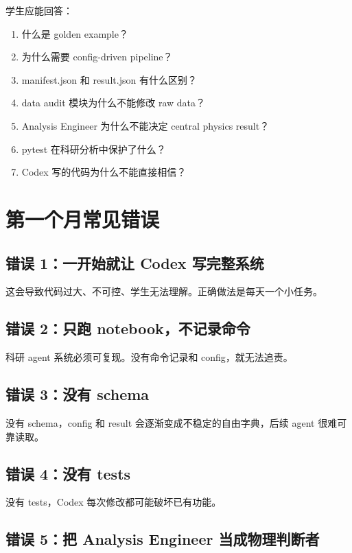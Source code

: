 \documentclass[11pt,a4paper,fontset=fandol]{ctexart}
\begin{document}
学生应能回答：

\begin{enumerate}[leftmargin=2em]
  \item 什么是 golden example？
  \item 为什么需要 config-driven pipeline？
  \item manifest.json 和 result.json 有什么区别？
  \item data audit 模块为什么不能修改 raw data？
  \item Analysis Engineer 为什么不能决定 central physics result？
  \item pytest 在科研分析中保护了什么？
  \item Codex 写的代码为什么不能直接相信？
\end{enumerate}

\section{第一个月常见错误}

\subsection{错误 1：一开始就让 Codex 写完整系统}

这会导致代码过大、不可控、学生无法理解。正确做法是每天一个小任务。

\subsection{错误 2：只跑 notebook，不记录命令}

科研 agent 系统必须可复现。没有命令记录和 config，就无法追责。

\subsection{错误 3：没有 schema}

没有 schema，config 和 result 会逐渐变成不稳定的自由字典，后续 agent 很难可靠读取。

\subsection{错误 4：没有 tests}

没有 tests，Codex 每次修改都可能破坏已有功能。

\subsection{错误 5：把 Analysis Engineer 当成物理判断者}
\end{document}
